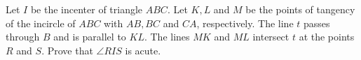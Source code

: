 Let $I$ be the incenter of triangle $ABC$. Let $K,L$ and $M$ be the points of tangency of the incircle of $ABC$ with $AB,BC$ and $CA$,  respectively. The line $t$ passes through $B$ and is parallel to $KL$. The lines $MK$ and $ML$ intersect $t$ at the points $R$ and $S$. Prove that $\angle RIS$ is acute.